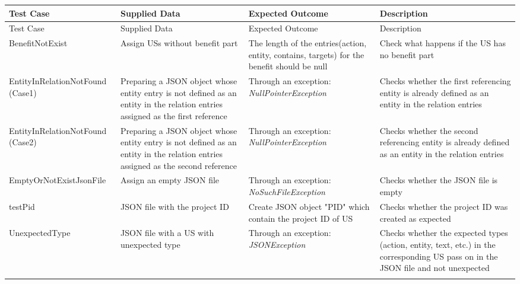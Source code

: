 \thispagestyle{empty}
\begingroup
\centering
\scriptsize
\renewcommand{\arraystretch}{1,5}
\keepXColumns
	\begin{tabularx}{\textwidth}{X  X  X  X}
	\hline
	Test Case &Supplied Data&Expected Outcome&Description\\
	\hline\hline
	\endfirsthead
	\hline
	Test Case &Supplied Data&Expected Outcome&Description\\
	\hline\hline
	\endhead
		BenefitNotExist&Assign USs without benefit part&The length of the entries(action, entity, contains, targets) for the benefit should be null&Check what happens if the US has no benefit part\\
		
		EntityInRelationNotFound \newline(Case1)&Preparing a JSON object whose entity entry is not defined as an entity in the relation entries assigned as the first reference&Through an exception: \textit{NullPointerException}&Checks whether the first referencing entity is already defined as an entity in the relation entries\\
		
		
		EntityInRelationNotFound \newline(Case2)&Preparing a JSON object whose entity entry is not defined as an entity in the relation entries assigned as the second reference&Through an exception: \textit{NullPointerException}&Checks whether the second referencing entity is already defined as an entity in the relation entries\\
		
		EmptyOrNotExistJsonFile&Assign an empty JSON file&Through an exception: \textit{NoSuchFileException}&Checks whether the JSON file is empty\\
		
		testPid&JSON file with the project ID&Create JSON object "PID" which contain the project ID of US&Checks whether the project ID was created as expected\\
		
		UnexpectedType&JSON file with a US with unexpected type&Through an exception: \textit{JSONException}&Checks whether the expected types (action, entity, text, etc.) in the corresponding US pass on in the JSON file and not unexpected\\
		
		
		\hline
		\caption{Test cases for USPartExtractor  class}\label{tb:test_cases_json_transformer}
	\end{tabularx}
\endgroup

